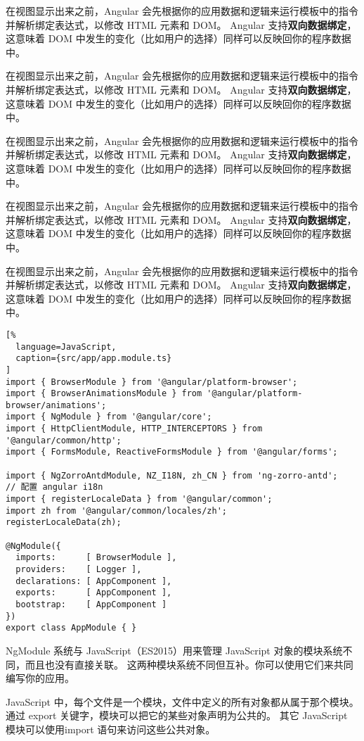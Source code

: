 \documentclass{progbookcn}
\begin{document}
在视图显示出来之前，Angular 会先根据你的应用数据和逻辑来运行模板中的指令并解析绑定表达式，以修改 HTML 元素和 DOM。 Angular 支持\textbf{双向数据绑定}，这意味着 DOM 中发生的变化（比如用户的选择）同样可以反映回你的程序数据中。

在视图显示出来之前，Angular 会先根据你的应用数据和逻辑来运行模板中的指令并解析绑定表达式，以修改 HTML 元素和 DOM。 Angular 支持\textbf{双向数据绑定}，这意味着 DOM 中发生的变化（比如用户的选择）同样可以反映回你的程序数据中。

在视图显示出来之前，Angular 会先根据你的应用数据和逻辑来运行模板中的指令并解析绑定表达式，以修改 HTML 元素和 DOM。 Angular 支持\textbf{双向数据绑定}，这意味着 DOM 中发生的变化（比如用户的选择）同样可以反映回你的程序数据中。

在视图显示出来之前，Angular 会先根据你的应用数据和逻辑来运行模板中的指令并解析绑定表达式，以修改 HTML 元素和 DOM。 Angular 支持\textbf{双向数据绑定}，这意味着 DOM 中发生的变化（比如用户的选择）同样可以反映回你的程序数据中。

在视图显示出来之前，Angular 会先根据你的应用数据和逻辑来运行模板中的指令并解析绑定表达式，以修改 HTML 元素和 DOM。 Angular 支持\textbf{双向数据绑定}，这意味着 DOM 中发生的变化（比如用户的选择）同样可以反映回你的程序数据中。

\begin{lstlisting}[%
  language=JavaScript,
  caption={src/app/app.module.ts}
]
import { BrowserModule } from '@angular/platform-browser';
import { BrowserAnimationsModule } from '@angular/platform-browser/animations';
import { NgModule } from '@angular/core';
import { HttpClientModule, HTTP_INTERCEPTORS } from '@angular/common/http';
import { FormsModule, ReactiveFormsModule } from '@angular/forms';

import { NgZorroAntdModule, NZ_I18N, zh_CN } from 'ng-zorro-antd';
// 配置 angular i18n
import { registerLocaleData } from '@angular/common';
import zh from '@angular/common/locales/zh';
registerLocaleData(zh);

@NgModule({
  imports:      [ BrowserModule ],
  providers:    [ Logger ],
  declarations: [ AppComponent ],
  exports:      [ AppComponent ],
  bootstrap:    [ AppComponent ]
})
export class AppModule { }
\end{lstlisting}

NgModule 系统与 JavaScript（ES2015）用来管理 JavaScript 对象的模块系统不同，而且也没有直接关联。 这两种模块系统不同但互补。你可以使用它们来共同编写你的应用。

JavaScript 中，每个文件是一个模块，文件中定义的所有对象都从属于那个模块。 通过 export 关键字，模块可以把它的某些对象声明为公共的。 其它 JavaScript 模块可以使用import 语句来访问这些公共对象。
\end{document}
